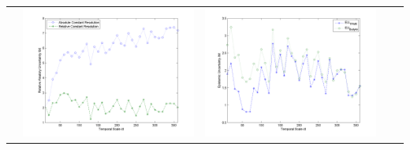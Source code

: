 \documentclass[11pt]{article}
\begin{document}
\begin{table}[H]
{\begin{tabular}{c  c   c   c c }
&\begin{minipage}{.4\textwidth}\includegraphics[width=\linewidth]{resultgraph/02472000AU.png}\end{minipage}
&\begin{minipage}{.4\textwidth}\includegraphics[width=\linewidth]{resultgraph/02472000EU.png}\end{minipage}
\\

\end{tabular}}
\end{table}
\end{document}
